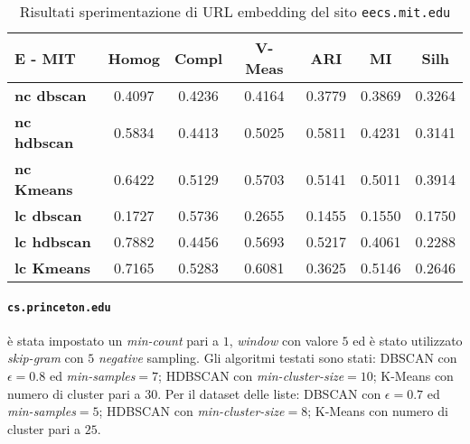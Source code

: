 \begin{table}[H]
	\begin{tabular}{| l | c | c | c | c | c | c |}
	\hline
	\textbf{E - MIT}  & \textbf{Homog} & \textbf{Compl} & \textbf{V-Meas}  & \textbf{ARI}  & \textbf{MI}  & \textbf{Silh} \\ [3ex] \hline
	\textbf{nc dbscan} & 0.4097 & 0.4236 & 0.4164 & 0.3779 & 0.3869 & 0.3264\\ [3ex]
	 \hline 
	\textbf{nc hdbscan} & 0.5834 & 0.4413 & 0.5025 & 0.5811 & 0.4231 & 0.3141\\ [3ex]
	 \hline
	\textbf{nc Kmeans} & 0.6422 & 0.5129 & 0.5703 & 0.5141 & 0.5011 & 0.3914\\ [3ex]
	 \hline	
	\textbf{lc dbscan} & 0.1727 & 0.5736 & 0.2655 & 0.1455 & 0.1550 & 0.1750\\ [3ex]
	\hline
	\textbf{lc hdbscan} & 0.7882 & 0.4456 & 0.5693 & 0.5217 & 0.4061 & 0.2288\\ [3ex]
	\hline
	\textbf{lc Kmeans} & 0.7165 & 0.5283 & 0.6081 & 0.3625 & 0.5146 & 0.2646\\ [3ex]
	\hline
	\end{tabular}
	\caption{Risultati sperimentazione di URL embedding del sito \texttt{eecs.mit.edu}}
	\label{metricheEmbedMit}
\end{table}

\paragraph{\texttt{cs.princeton.edu}} è stata impostato un \textit{min-count} pari a $1$, \textit{window} con valore $5$ ed è stato utilizzato \textit{skip-gram} con $5$ \textit{negative} sampling. Gli algoritmi testati sono stati: DBSCAN con $\epsilon = 0.8$ ed \textit{min-samples}$ = 7$; HDBSCAN con \textit{min-cluster-size}$=10$; K-Means con numero di cluster pari a $30$. Per il dataset delle liste: DBSCAN con $\epsilon = 0.7$ ed \textit{min-samples}$ = 5$; HDBSCAN con \textit{min-cluster-size}$=8$; K-Means con numero di cluster pari a $25$.

